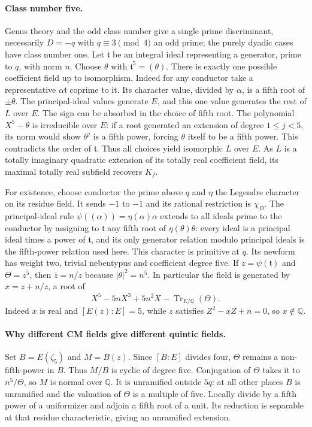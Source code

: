 \paragraph{Class number five.}
Genus theory and the odd class number give a single prime discriminant,
necessarily $D=-q$ with $q\equiv3\pmod4$ an odd prime; the purely
dyadic cases have class number one. Let $\mathfrak t$ be an integral
ideal representing a generator, prime to $q$, with norm $n$.
Choose $\theta$ with $\mathfrak t^5=(\theta)$.
There is exactly one possible coefficient field up to isomorphism.
Indeed for any conductor take a representative $\alpha\mathfrak t$
coprime to it. Its character value, divided by $\alpha$, is a fifth
root of $\pm\theta$. The principal-ideal values generate $E$, and this
one value generates the rest of $L$ over $E$. The sign can be absorbed
in the choice of fifth root. The polynomial $X^5-\theta$ is
irreducible over $E$: if a root generated an extension of degree
$1\leq j<5$, its norm would show $\theta^j$ is a fifth power, forcing
$\theta$ itself to be a fifth power. This contradicts the order of
$\mathfrak t$. Thus all choices yield isomorphic $L$ over $E$.
As $L$ is a totally imaginary quadratic extension of its totally real
coefficient field, its maximal totally real subfield recovers $K_f$.

For existence, choose conductor the prime above $q$ and $\eta$ the
Legendre character on its residue field. It sends $-1$ to $-1$ and its
rational restriction is $\chi_D$. The principal-ideal rule
$\psi((\alpha))=\eta(\alpha)\alpha$ extends to all ideals prime to the
conductor by assigning to $\mathfrak t$ any fifth root of
$\eta(\theta)\theta$: every ideal is a principal ideal times a power
of $\mathfrak t$, and its only generator relation modulo principal
ideals is the fifth-power relation used here. This character is primitive
at $q$. Its newform has weight two, trivial nebentypus and coefficient
degree five. If $z=\psi(\mathfrak t)$ and $\Theta=z^5$, then
$\overline z=n/z$ because $|\theta|^2=n^5$. In particular the field
is generated by $x=z+n/z$, a root of
\[
X^5-5nX^3+5n^2X-\operatorname{Tr}_{E/\mathbb Q}(\Theta).
\]
Indeed $x$ is real and $[E(z):E]=5$, while $z$ satisfies
$Z^2-xZ+n=0$, so $x\notin\mathbb Q$.

\paragraph{Why different CM fields give different quintic fields.}
Set $B=E(\zeta_5)$ and $M=B(z)$. Since $[B:E]$ divides four,
$\Theta$ remains a non-fifth-power in $B$. Thus $M/B$ is cyclic of
degree five. Conjugation of $\Theta$ takes it to $n^5/\Theta$, so $M$
is normal over $\mathbb Q$. It is unramified outside $5q$: at all
other places $B$ is unramified and the valuation of $\Theta$ is a
multiple of five. Locally divide by a fifth power of a uniformizer
and adjoin a fifth root of a unit. Its reduction is separable at that
residue characteristic, giving an unramified extension.

